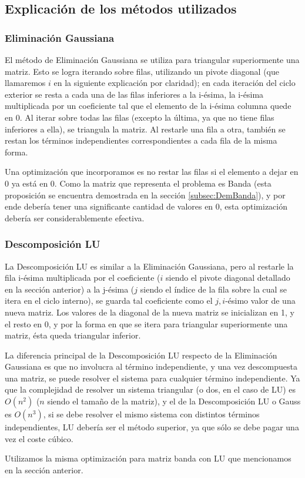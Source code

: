 \subsection{Explicaci\'on de los m\'etodos utilizados}
\subsubsection{Eliminaci\'on Gaussiana}
\par El m\'etodo de Eliminaci\'on Gaussiana se utiliza para triangular superiormente una matriz. Esto se logra iterando sobre filas, utilizando un pivote diagonal (que llamaremos $i$ en la siguiente explicaci\'on por claridad); en cada iteraci\'on del ciclo exterior se resta a cada una de las filas inferiores a la i-\'esima, la i-\'esima multiplicada por un coeficiente tal que el elemento de la i-\'esima columna quede en 0. Al iterar sobre todas las filas (excepto la \'ultima, ya que no tiene filas inferiores a ella), se triangula la matriz. Al restarle una fila a otra, tambi\'en se restan los t\'erminos independientes correspondientes a cada fila de la misma forma.
\par Una optimizaci\'on que incorporamos es no restar las filas si el elemento a dejar en 0 ya est\'a en 0. Como la matriz que representa el problema es Banda (esta proposici\'on se encuentra demostrada en la secci\'on \ref{subsec:DemBanda}), y por ende deber\'ia tener una significante cantidad de valores en 0, esta optimizaci\'on deber\'ia ser considerablemente efectiva.
\subsubsection{Descomposici\'on LU}
\par La Descomposici\'on LU es similar a la Eliminaci\'on Gaussiana, pero al restarle la fila i-\'esima multiplicada por el coeficiente ($i$ siendo el pivote diagonal detallado en la secci\'on anterior) a la j-\'esima ($j$ siendo el \'indice de la fila sobre la cual se itera en el ciclo interno), se guarda tal coeficiente como el $j,i$-\'esimo valor de una nueva matriz. Los valores de la diagonal de la nueva matriz se inicializan en 1, y el resto en 0, y por la forma en que se itera para triangular superiormente una matriz, \'esta queda triangular inferior. 
\par La diferencia principal de la Descomposici\'on LU respecto de la Eliminaci\'on Gaussiana es que no involucra al t\'ermino independiente, y una vez descompuesta una matriz, se puede resolver el sistema para cualquier t\'ermino independiente. Ya que la complejidad de resolver un sistema triangular (o dos, en el caso de LU) es $O(n^2)$ ($n$ siendo el tama\~no de la matriz), y el de la Descomposici\'on LU o Gauss es $O(n^3)$, si se debe resolver el mismo sistema con distintos t\'erminos independientes, LU deber\'ia ser el m\'etodo superior, ya que s\'olo se debe pagar una vez el coste c\'ubico.
\par Utilizamos la misma optimizaci\'on para matriz banda con LU que mencionamos en la secci\'on anterior.
